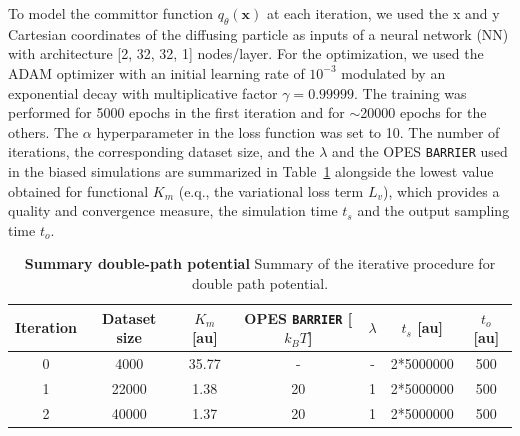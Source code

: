             To model the committor function $q_\theta(\textbf{x})$ at each iteration, we used the x and y Cartesian coordinates of the diffusing particle as inputs of a neural network (NN) with architecture [2, 32, 32, 1] nodes/layer.
            For the optimization, we used the ADAM optimizer with an initial learning rate of $10^{-3}$ modulated by an exponential decay with multiplicative factor $\gamma=0.99999$. The training was performed for 5000 epochs in the first iteration and for $\sim$20000 epochs for the others. 
            The $\alpha$ hyperparameter in the loss function was set to 10.
            The number of iterations, the corresponding dataset size, and the $\lambda$ and the OPES \texttt{BARRIER} used in the biased simulations are summarized in Table~\ref{sup_tab:double_path_iterations} alongside the lowest value obtained for functional $K_m$ (e.q., the variational loss term $L_v$), which provides a quality and convergence measure, the simulation time $t_s$ and the output sampling time $t_o$. 
            \begin {table}[h!]
                \caption {\textbf{Summary double-path potential} Summary of the iterative procedure for double path potential.} \label{sup_tab:double_path_iterations}
                \vspace{-5mm}
                \begin{center}
                \begin{tabular}{ |c|c|c|c|c|c|c| } 
                 \hline
                 Iteration & Dataset size & $K_m$ [au] & OPES \texttt{BARRIER} [$k_BT$] & $\lambda$ & $t_s$ [au] & $t_o$ [au] \\ 
                 \hline
                    0   & 4000 &  35.77  & - & - & 2*5000000 & 500 \\
                    1   & 22000 &  1.38 & 20 & 1 & 2*5000000 & 500\\
                    2   & 40000 & 1.37  & 20 & 1 & 2*5000000 & 500 \\  
                 \hline
                \end{tabular}
                \end{center}
            \end {table}
    
    \vspace{-5mm}
